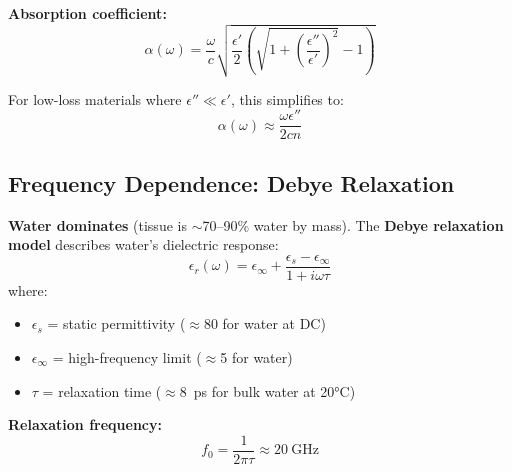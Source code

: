 \textbf{Absorption coefficient:}
\begin{equation}
\label{eq:absorption-coefficient}
\alpha(\omega) = \frac{\omega}{c} \sqrt{\frac{\epsilon'}{2} \left( \sqrt{1 + \left(\frac{\epsilon''}{\epsilon'}\right)^2} - 1 \right)}
\end{equation}

For low-loss materials where $\epsilon'' \ll \epsilon'$, this simplifies to:
\begin{equation}
\label{eq:absorption-simplified}
\alpha(\omega) \approx \frac{\omega \epsilon''}{2cn}
\end{equation}

\subsection{Frequency Dependence: Debye Relaxation}
\label{subsec:frequency-dependence}

\textbf{Water dominates} (tissue is $\sim$70--90\% water by mass). The \textbf{Debye relaxation model} describes water's dielectric response:
\begin{equation}
\label{eq:debye-relaxation}
\epsilon_r(\omega) = \epsilon_\infty + \frac{\epsilon_s - \epsilon_\infty}{1 + i\omega \tau}
\end{equation}
where:
\begin{itemize}
\item $\epsilon_s$ = static permittivity ($\approx$80 for water at DC)
\item $\epsilon_\infty$ = high-frequency limit ($\approx$5 for water)
\item $\tau$ = relaxation time ($\approx$8~ps for bulk water at 20°C)
\end{itemize}

\textbf{Relaxation frequency:}
\begin{equation}
\label{eq:relaxation-frequency}
f_0 = \frac{1}{2\pi \tau} \approx 20~\text{GHz}
\end{equation}

